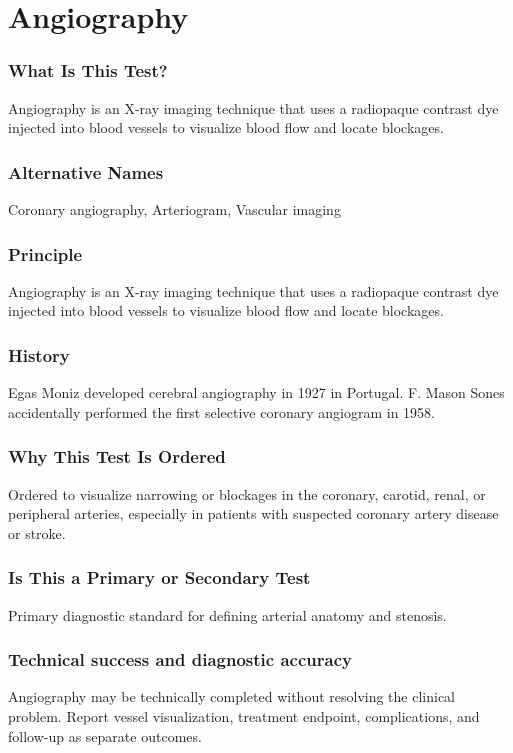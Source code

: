\section{Angiography}


\subsubsection*{What Is This Test?}
Angiography is an X-ray imaging technique that uses a radiopaque contrast dye injected into blood vessels to visualize blood flow and locate blockages.

\subsubsection*{Alternative Names}
Coronary angiography, Arteriogram, Vascular imaging

\subsubsection*{Principle}
Angiography is an X-ray imaging technique that uses a radiopaque contrast dye injected into blood vessels to visualize blood flow and locate blockages.

\subsubsection*{History}
Egas Moniz developed cerebral angiography in 1927 in Portugal. F. Mason Sones accidentally performed the first selective coronary angiogram in 1958.

\subsubsection*{Why This Test Is Ordered}
Ordered to visualize narrowing or blockages in the coronary, carotid, renal, or peripheral arteries, especially in patients with suspected coronary artery disease or stroke.

\subsubsection*{Is This a Primary or Secondary Test}
Primary diagnostic standard for defining arterial anatomy and stenosis.

\subsubsection*{Technical success and diagnostic accuracy}
Angiography may be technically completed without resolving the clinical problem. Report vessel visualization, treatment endpoint, complications, and follow-up as separate outcomes.


